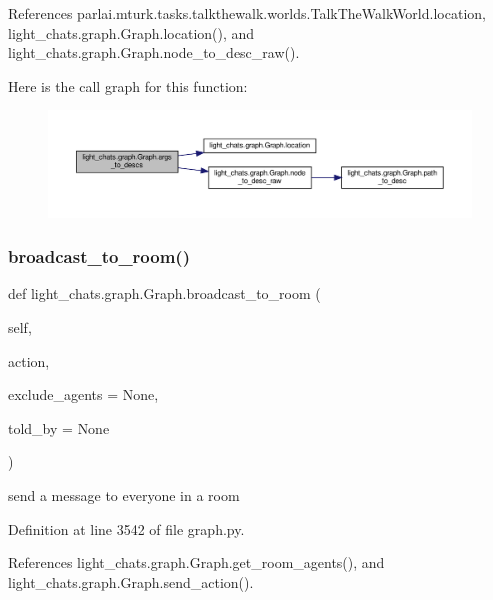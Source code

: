 References parlai.\+mturk.\+tasks.\+talkthewalk.\+worlds.\+Talk\+The\+Walk\+World.\+location, light\+\_\+chats.\+graph.\+Graph.\+location(), and light\+\_\+chats.\+graph.\+Graph.\+node\+\_\+to\+\_\+desc\+\_\+raw().

Here is the call graph for this function\+:
\nopagebreak
\begin{figure}[H]
\begin{center}
\leavevmode
\includegraphics[width=350pt]{classlight__chats_1_1graph_1_1Graph_ad0c4f66ad462e7aa45324767c551030a_cgraph}
\end{center}
\end{figure}
\mbox{\label{classlight__chats_1_1graph_1_1Graph_ae53a707683cac4ddbafbefb0e0130bfa}} 
\subsubsection{\texorpdfstring{broadcast\+\_\+to\+\_\+room()}{broadcast\_to\_room()}}
{\footnotesize\ttfamily def light\+\_\+chats.\+graph.\+Graph.\+broadcast\+\_\+to\+\_\+room (\begin{DoxyParamCaption}\item[{}]{self,  }\item[{}]{action,  }\item[{}]{exclude\+\_\+agents = {\ttfamily None},  }\item[{}]{told\+\_\+by = {\ttfamily None} }\end{DoxyParamCaption})}

\begin{DoxyVerb}send a message to everyone in a room\end{DoxyVerb}
 

Definition at line 3542 of file graph.\+py.



References light\+\_\+chats.\+graph.\+Graph.\+get\+\_\+room\+\_\+agents(), and light\+\_\+chats.\+graph.\+Graph.\+send\+\_\+action().



